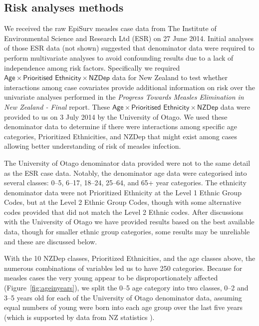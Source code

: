 \documentclass{article}
\begin{document}
\subsection{Risk analyses methods}
We received the raw EpiSurv measles case data from The Institute of Environmental Science and Research Ltd (ESR) on 27 June 2014. Initial analyses of those ESR data (not shown) suggested that denominator data were required to perform multivariate analyses to avoid confounding results due to a lack of independence among risk factors. Specifically we required $\textsf{Age} \times \textsf{Prioritised Ethnicity} \times \textsf{NZDep}$ data for New Zealand to test whether interactions among case covariates provide additional information on risk over the univariate analyses performed in the \emph{Progress Towards Measles Elimination in New Zealand - Final} report. These $\textsf{Age} \times \textsf{Prioritised Ethnicity} \times \textsf{NZDep}$ data were provided to us on 3 July 2014 by the University of Otago. We used these denominator data to determine if there were interactions among specific age categories, Prioritized Ethnicities, and NZDep that might exist among cases allowing better understanding of risk of measles infection.

The University of Otago denominator data provided were not to the same detail as the ESR case data. Notably, the denominator age data were categorised into several classes: 0--5, 6--17, 18--24, 25--64, and 65+ year categories. The ethnicity denominator data were not Prioritized Ethnicity at the Level 1 Ethnic Group Codes, but at the Level 2 Ethnic Group Codes, though with some alternative codes provided that did not match the Level 2 Ethnic codes. After discussions with the University of Otago we have provided results based on the best available data, though for smaller ethnic group categories, some results may be unreliable and these are discussed below.

With the 10 NZDep classes, Prioritized Ethnicities, and the age classes above, the numerous combinations of variables led us to have 250 categories. Because for measles cases the very young appear to be disproportionately affected (Figure~\ref{fig:ageinyears}), we split the 0--5 age category into two classes, 0--2 and 3--5 years old for each of the University of Otago denominator data, assuming equal numbers of young were born into each age group over the last five years (which is supported by data from NZ statistics \citep{stats14}).
\end{document}
